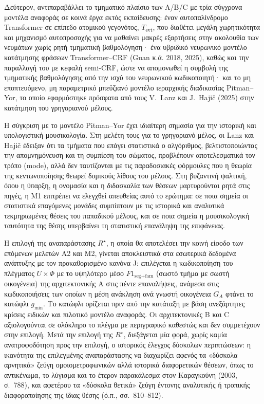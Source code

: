 \documentclass[11pt,a4paper]{article}
\newcommand{\Rs}{R^{\star}}
\begin{document}
Δεύτερον, αντιπαραβάλλει το τμηματικό πλαίσιο των A/B/C με τρία σύγχρονα μοντέλα αναφοράς σε κοινά έργα εκτός εκπαίδευσης: έναν αυτοπαλίνδρομο Transformer σε επίπεδο ατομικού γεγονότος, $T_{\text{evt}}$, που διαθέτει μεγάλη χωρητικότητα και μηχανισμό αυτοπροσοχής για να μαθαίνει μακρές εξαρτήσεις στην ακολουθία των νευμάτων χωρίς ρητή τμηματική βαθμολόγηση· ένα υβριδικό νευρωνικό μοντέλο κατάτμησης φράσεων Transformer--CRF (Guan κ.ά. 2018, 2025), καθώς και την παραλλαγή του με κεφαλή semi-CRF, ώστε να απομονωθεί η συμβολή της τμηματικής βαθμολόγησης από την ισχύ του νευρωνικού κωδικοποιητή· και το μη εποπτευόμενο, μη παραμετρικό μπεϋζιανό μοντέλο ιεραρχικής διαδικασίας Pitman--Yor, το οποίο εφαρμόστηκε πρόσφατα από τους V.~Lanz και J.~Hajič (2025) στην κατάτμηση του γρηγοριανού μέλους.

Η σύγκριση με το μοντέλο Pitman--Yor έχει ιδιαίτερη σημασία για την ιστορική και υπολογιστική μουσικολογία. Στη μελέτη τους για το γρηγοριανό μέλος, οι Lanz και Hajič έδειξαν ότι τα τμήματα που επάγει στατιστικά ο αλγόριθμος, βελτιστοποιώντας την απομνημόνευση και τη συμπίεση του σώματος, προβλέπουν αποτελεσματικά τον τρόπο (mode), αλλά δεν ταυτίζονται με τις παραδοσιακές φόρμουλες που η θεωρία της κεντωνοποίησης θεωρεί δομικούς λίθους του μέλους. Στη βυζαντινή ψαλτική, όπου η ύπαρξη, η ονομασία και η διδασκαλία των θέσεων μαρτυρούνται ρητά στις πηγές, η Μ1 επιτρέπει να ελεγχθεί απευθείας αυτό το ερώτημα: σε ποια σημεία οι στατιστικά επαγόμενες μονάδες συμπίπτουν με τις ιστορικά και αναλυτικά τεκμηριωμένες θέσεις του παπαδικού μέλους, και σε ποια σημεία η μουσικολογική ταυτότητα της θέσης υπερβαίνει τη στατιστική επανάληψη της επιφάνειας.

Η επιλογή της αναπαράστασης $\Rs$, η οποία θα αποτελέσει την κοινή είσοδο των επόμενων μελετών Α2 και Μ2, γίνεται αποκλειστικά στα εσωτερικά δεδομένα ανάπτυξης με τον προκαθορισμένο κανόνα J: επιλέγεται η κωδικοποίηση του πλέγματος $U\times\Phi$ με το υψηλότερο μέσο $F1_{\text{seg+fam}}$ (σωστό τμήμα με σωστή οικογένεια) της αρχιτεκτονικής A στις πέντε επαναλήψεις, ανάμεσα στις κωδικοποιήσεις των οποίων η μέση ανάκληση ανά γνωστή οικογένεια $G_A$ φτάνει το κατώφλι $g_{\min}$. Το κατώφλι ορίζεται πριν από την κατάταξη με βάση ανεξάρτητες κρίσεις ειδικών και πιλοτικό μοντέλο αναφοράς. Οι αρχιτεκτονικές B και C αξιολογούνται σε ολόκληρο το πλέγμα με περιγραφικό καθεστώς και δεν συμμετέχουν στην επιλογή. Μετά την επιλογή της $\Rs$, διεξάγεται μία φορά, χωρίς καμία ανατροφοδότηση προς την επιλογή, ο ιστορικός έλεγχος δύσκολων περιπτώσεων: η ικανότητα της επιλεγμένης αναπαράστασης να διαχωρίζει αφενός τα «δύσκολα αρνητικά» ζεύγη ομοιομετροφωνικών αλλά ιστορικά διαφορετικών θέσεων, όπως το αντικένωμα, το λύγισμα και το έτερον παρακάλεσμα στον Καραγκούνη (2003, σ.~788), και αφετέρου τα «δύσκολα θετικά» ζεύγη έντονης αναλυτικής ή τροπικής διαφοροποίησης της ίδιας θέσης (ό.π., σσ.~810--812).
\end{document}
